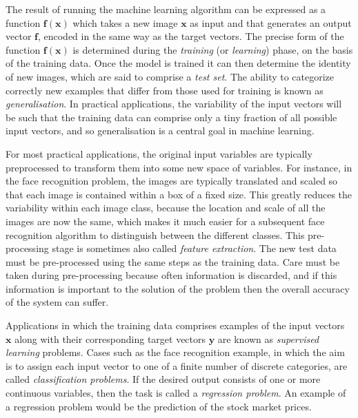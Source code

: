 \documentclass[12pt]{report}
\numberwithin{equation}{section}
\begin{document}
The result of running the machine learning algorithm can be expressed as a function $\bm{f(x)}$ which takes a new image $\bm{x}$ as input and that generates an output vector $\bm{f}$, encoded in the same way as the target vectors. The precise form of the function $\bm{f(x)}$ is determined during the \textit{training} (or \textit{learning}) phase, on the basis of the training data. Once the model is trained it can then determine the identity of new images, which are said to comprise a \textit{test set}. The ability to categorize correctly new examples that differ from those used for training is known as \textit{generalisation}. In practical applications, the variability of the input vectors will be such that the training data can comprise only a tiny fraction of all possible input vectors, and so generalisation is a central goal in machine learning.

For most practical applications, the original input variables are typically preprocessed to transform them into some new space of variables. For instance, in the face recognition problem, the images  are typically translated and scaled so that each image is contained within a box of a fixed size. This greatly reduces the variability within each image class, because the location and scale of all the images are now the same, which makes it much easier for a subsequent face recognition algorithm to distinguish between the different classes. This pre-processing stage is sometimes also called \textit{feature extraction}. The new test data must be pre-processed using the same steps as the training data. Care must be taken during pre-processing because often information is discarded, and if this information is important to the solution of the problem then the overall accuracy of the system can suffer.

Applications in which the training data comprises examples of the input vectors $\bm{x}$ along with their corresponding target vectors $\bm{y}$ are known as \textit{supervised learning} problems. Cases such as the face recognition example, in which the aim is to assign each input vector to one of a finite number of discrete categories, are called \textit{classification problems}. If the desired output consists of one or more continuous variables, then the task is called a \textit{regression problem}. An example of a regression problem would be the prediction of the stock market prices.
\end{document}

